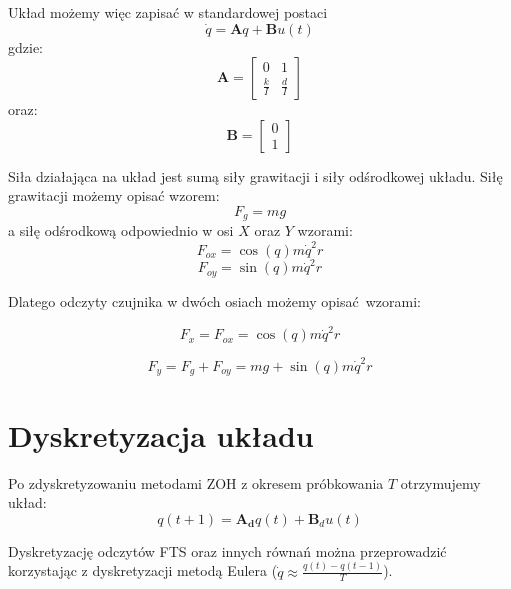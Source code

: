 \documentclass[a4paper, 10pt]{article}
\begin{document}
Układ możemy więc zapisać w standardowej postaci
\begin{equation}
\dot{q} = \textbf{A}q + \textbf{B}u(t)
\end{equation}
gdzie:
\begin{equation}
\mathbf{A} = 	\begin{bmatrix}
	    0 & 1 \\
	    \frac{k}{I} & \frac{d}{I}
	\end{bmatrix}
\end{equation}
oraz:
\begin{equation}
\mathbf{B} = \begin{bmatrix}
	    0 \\
	    1
	\end{bmatrix}
\end{equation}

Siła działająca na układ jest sumą siły grawitacji i siły odśrodkowej układu.
Siłę grawitacji możemy opisać wzorem:
\begin{equation}
F_g = mg
\end{equation}
a siłę odśrodkową odpowiednio w osi $X$ oraz $Y$ wzorami:
\begin{equation}
F_{ox} =  \cos{(q)}m\dot{q}^2 r
\end{equation}
\begin{equation}
F_{oy} =  \sin{(q)}m\dot{q}^2 r
\end{equation}


Dlatego odczyty czujnika w dwóch osiach możemy opisać wzorami:

\begin{equation}
F_x = F_{ox} = \cos{(q)}m\dot{q}^2 r
\end{equation}

\begin{equation}
\label{eq:fy}
F_y = F_g + F_{oy} = mg + \sin{(q)}m\dot{q}^2 r
\end{equation}


\section{Dyskretyzacja układu}
Po zdyskretyzowaniu metodami ZOH z okresem próbkowania $T$ otrzymujemy układ:
\begin{equation}
q(t+1) = \mathbf{A_d}q(t) + \mathbf{B}_du(t)
\label{eq:dyskretny}
\end{equation}

Dyskretyzację odczytów FTS  oraz innych równań można przeprowadzić korzystając z dyskretyzacji metodą Eulera ($\dot{q} \approx \frac{q(t)-q(t-1)}{T}$). 
\end{document}
